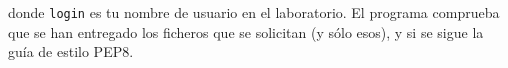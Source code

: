 \documentclass[11pt,a4paper]{article}
\begin{document}
donde \texttt{login} es tu nombre de usuario en el laboratorio. El programa comprueba que se han entregado los ficheros que se solicitan (y sólo esos), y si se sigue la guía de estilo PEP8. 

\vspace{1cm}

\end{document}
